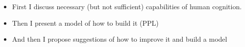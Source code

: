 \begin{itemize}
    \item First I discuss necessary (but not sufficient) capabilities of human cognition. 
    \item Then I present a model of how to build it (PPL)
    \item And then I propose suggestions of how to improve it and build a model 
\end{itemize}













